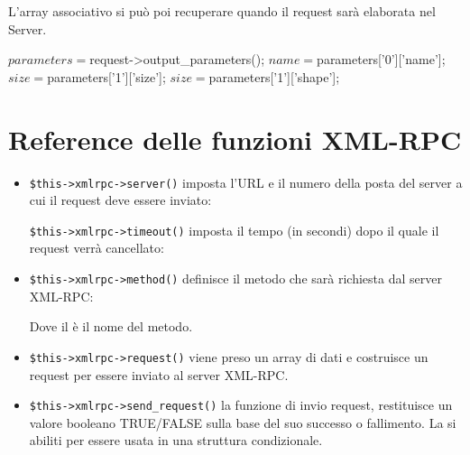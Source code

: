 L'array associativo si può poi recuperare quando il request sarà elaborata nel Server.

\begin{code}
$parameters = $request->output_parameters();
$name = $parameters['0']['name'];
$size = $parameters['1']['size'];
$size = $parameters['1']['shape'];
\end{code}

\section*{Reference delle funzioni XML-RPC}

\begin{itemize}
\item \verb|$this->xmlrpc->server()| imposta l'URL e il numero della posta del server a cui il request deve essere inviato:


\verb|$this->xmlrpc->timeout()| imposta il tempo (in secondi) dopo il quale il request verrà cancellato:


\item \verb|$this->xmlrpc->method()| definisce il metodo che sarà richiesta dal server XML-RPC:


Dove il  è il nome del metodo.

\item \verb|$this->xmlrpc->request()| viene preso un array di dati e costruisce un request per essere inviato al server XML-RPC.


\item \verb|$this->xmlrpc->send_request()| la funzione di invio request, restituisce un valore booleano TRUE/FALSE sulla base del suo successo o fallimento. La si abiliti per essere usata in una struttura condizionale.


\end{itemize}
